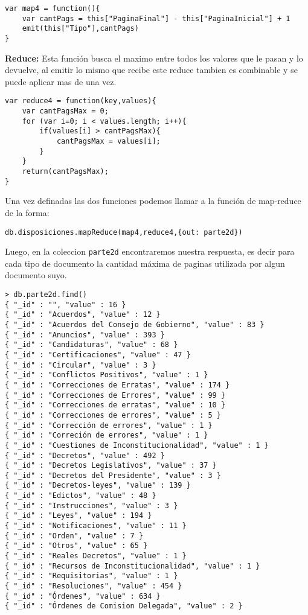 \begin{lstlisting}
var map4 = function(){
	var cantPags = this["PaginaFinal"] - this["PaginaInicial"] + 1
	emit(this["Tipo"],cantPags)
}
\end{lstlisting}
\textbf{Reduce:}
Esta función busca el maximo entre todos los valores que le pasan y lo devuelve, al emitir lo mismo que recibe este reduce tambien
es combinable y se puede aplicar mas de una vez.
\begin{lstlisting}
var reduce4 = function(key,values){
	var cantPagsMax = 0;
	for (var i=0; i < values.length; i++){
		if(values[i] > cantPagsMax){
			cantPagsMax = values[i];
		}
	}
	return(cantPagsMax);
}
\end{lstlisting}

Una vez definadas las dos funciones podemos llamar a la función de map-reduce de la forma:

\begin{lstlisting}
db.disposiciones.mapReduce(map4,reduce4,{out: parte2d})
\end{lstlisting}

Luego, en la coleccion \texttt{parte2d} encontraremos nuestra respuesta, es decir para cada tipo de documento la cantidad máxima de paginas utilizada por algun documento suyo.

\begin{lstlisting}
> db.parte2d.find()
{ "_id" : "", "value" : 16 }
{ "_id" : "Acuerdos", "value" : 12 }
{ "_id" : "Acuerdos del Consejo de Gobierno", "value" : 83 }
{ "_id" : "Anuncios", "value" : 393 }
{ "_id" : "Candidaturas", "value" : 68 }
{ "_id" : "Certificaciones", "value" : 47 }
{ "_id" : "Circular", "value" : 3 }
{ "_id" : "Conflictos Positivos", "value" : 1 }
{ "_id" : "Correcciones de Erratas", "value" : 174 }
{ "_id" : "Correcciones de Errores", "value" : 99 }
{ "_id" : "Correcciones de erratas", "value" : 10 }
{ "_id" : "Correcciones de errores", "value" : 5 }
{ "_id" : "Corrección de errores", "value" : 1 }
{ "_id" : "Correción de errores", "value" : 1 }
{ "_id" : "Cuestiones de Inconstitucionalidad", "value" : 1 }
{ "_id" : "Decretos", "value" : 492 }
{ "_id" : "Decretos Legislativos", "value" : 37 }
{ "_id" : "Decretos del Presidente", "value" : 3 }
{ "_id" : "Decretos-leyes", "value" : 139 }
{ "_id" : "Edictos", "value" : 48 }
{ "_id" : "Instrucciones", "value" : 3 }
{ "_id" : "Leyes", "value" : 194 }
{ "_id" : "Notificaciones", "value" : 11 }
{ "_id" : "Orden", "value" : 7 }
{ "_id" : "Otros", "value" : 65 }
{ "_id" : "Reales Decretos", "value" : 1 }
{ "_id" : "Recursos de Inconstitucionalidad", "value" : 1 }
{ "_id" : "Requisitorias", "value" : 1 }
{ "_id" : "Resoluciones", "value" : 454 }
{ "_id" : "Órdenes", "value" : 634 }
{ "_id" : "Órdenes de Comision Delegada", "value" : 2 }
\end{lstlisting}
